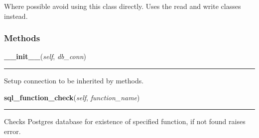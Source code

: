 Where possible avoid using this class directly. Uses the read and write 
classes instead.



  \subsubsection{Methods}

    \label{nx_pgnet:nisql:__init__}

    \vspace{0.5ex}

\hspace{.8\funcindent}\begin{boxedminipage}{\funcwidth}

    \raggedright \textbf{\_\_init\_\_}(\textit{self}, \textit{db\_conn})

    \vspace{-1.5ex}

    \rule{\textwidth}{0.5\fboxrule}
\setlength{\parskip}{2ex}
    Setup connection to be inherited by methods.

\setlength{\parskip}{1ex}
    \end{boxedminipage}

    \label{nx_pgnet:nisql:sql_function_check}

    \vspace{0.5ex}

\hspace{.8\funcindent}\begin{boxedminipage}{\funcwidth}

    \raggedright \textbf{sql\_function\_check}(\textit{self}, \textit{function\_name})

    \vspace{-1.5ex}

    \rule{\textwidth}{0.5\fboxrule}
\setlength{\parskip}{2ex}
    Checks Postgres database for existence of specified function, if not 
    found raises error.

\setlength{\parskip}{1ex}
    \end{boxedminipage}

